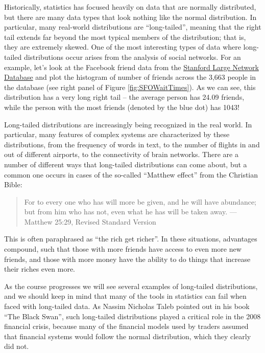 \documentclass[
  12pt,
]{book}
\begin{document}
Historically, statistics has focused heavily on data that are normally distributed, but there are many data types that look nothing like the normal distribution. In particular, many real-world distributions are ``long-tailed'', meaning that the right tail extends far beyond the most typical members of the distribution; that is, they are extremely skewed. One of the most interesting types of data where long-tailed distributions occur arises from the analysis of social networks. For an example, let's look at the Facebook friend data from the \href{https://snap.stanford.edu/data/egonets-Facebook.html}{Stanford Large Network Database} and plot the histogram of number of friends across the 3,663 people in the database (see right panel of Figure \ref{fig:SFOWaitTimes}). As we can see, this distribution has a very long right tail -- the average person has 24.09 friends, while the person with the most friends (denoted by the blue dot) has 1043!

Long-tailed distributions are increasingly being recognized in the real world. In particular, many features of complex systems are characterized by these distributions, from the frequency of words in text, to the number of flights in and out of different airports, to the connectivity of brain networks. There are a number of different ways that long-tailed distributions can come about, but a common one occurs in cases of the so-called ``Matthew effect'' from the Christian Bible:

\begin{quote}
For to every one who has will more be given, and he will have abundance; but from him who has not, even what he has will be taken away. --- Matthew 25:29, Revised Standard Version
\end{quote}

This is often paraphrased as ``the rich get richer''. In these situations, advantages compound, such that those with more friends have access to even more new friends, and those with more money have the ability to do things that increase their riches even more.

As the course progresses we will see several examples of long-tailed distributions, and we should keep in mind that many of the tools in statistics can fail when faced with long-tailed data. As Nassim Nicholas Taleb pointed out in his book ``The Black Swan'', such long-tailed distributions played a critical role in the 2008 financial crisis, because many of the financial models used by traders assumed that financial systems would follow the normal distribution, which they clearly did not.
\end{document}
